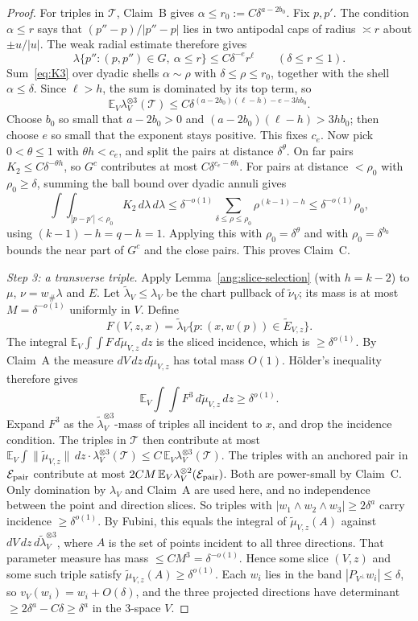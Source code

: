 \documentclass[11pt,reqno]{amsart}
\begin{document}
\begin{proof}
For triples in $\mathcal T$, Claim~B gives $\alpha\le r_0:=C\delta^{a-2b_0}$. Fix $p,p'$. The condition $\alpha\le r$ says that $(p''-p)/|p''-p|$ lies in two antipodal caps of radius $\asymp r$ about $\pm u/|u|$. The weak radial estimate therefore gives
\[
 \lambda\{p'':(p,p'')\in G,\ \alpha\le r\}\le C\delta^{-e}r^\ell\qquad(\delta\le r\le1).
\]
Sum~\eqref{eq:K3} over dyadic shells $\alpha\sim\rho$ with $\delta\le\rho\le r_0$, together with the shell $\alpha\le\delta$. Since $\ell>h$, the sum is dominated by its top term, so
\[
 \mathbb E_V\lambda_V^{\otimes3}(\mathcal T)\le C\delta^{(a-2b_0)(\ell-h)-e-3hb_0}.
\]
Choose $b_0$ so small that $a-2b_0>0$ and $(a-2b_0)(\ell-h)>3hb_0$; then choose $e$ so small that the exponent stays positive. This fixes $c_e$. Now pick $0<\theta\le1$ with $\theta h<c_e$, and split the pairs at distance $\delta^\theta$. On far pairs $K_2\le C\delta^{-\theta h}$, so $G^c$ contributes at most $C\delta^{c_e-\theta h}$. For pairs at distance $<\rho_0$ with $\rho_0\ge\delta$, summing the ball bound over dyadic annuli gives
\[
 \int\!\!\int_{|p-p'|<\rho_0}K_2\,d\lambda\,d\lambda\le\delta^{-o(1)}\sum_{\delta\le\rho\le\rho_0}\rho^{(k-1)-h}\le\delta^{-o(1)}\rho_0,
\]
using $(k-1)-h=q-h=1$. Applying this with $\rho_0=\delta^\theta$ and with $\rho_0=\delta^{b_0}$ bounds the near part of $G^c$ and the close pairs. This proves Claim~C.

\emph{Step 3: a transverse triple.} Apply Lemma~\ref{ang:slice-selection} (with $h=k-2$) to $\mu$, $\nu=w_\#\lambda$ and $E$. Let $\widetilde\lambda_V\le\lambda_V$ be the chart pullback of $\widetilde\nu_V$; its mass is at most $M=\delta^{-o(1)}$ uniformly in $V$. Define
\[
 F(V,z,x)=\widetilde\lambda_V\{p:(x,w(p))\in\widetilde E_{V,z}\}.
\]
The integral $\mathbb E_V\!\int\!\!\int F\,d\widetilde\mu_{V,z}\,dz$ is the sliced incidence, which is $\ge\delta^{o(1)}$. By Claim~A the measure $dV\,dz\,d\widetilde\mu_{V,z}$ has total mass $O(1)$. Hölder's inequality therefore gives
\[
 \mathbb E_V\int\!\!\int F^3\,d\widetilde\mu_{V,z}\,dz\ge\delta^{o(1)}.
\]
Expand $F^3$ as the $\widetilde\lambda_V^{\otimes3}$-mass of triples all incident to $x$, and drop the incidence condition. The triples in $\mathcal T$ then contribute at most $\mathbb E_V\int\|\widetilde\mu_{V,z}\|\,dz\cdot\lambda_V^{\otimes3}(\mathcal T)\le C\,\mathbb E_V\lambda_V^{\otimes3}(\mathcal T)$. The triples with an anchored pair in $\mathcal E_{\rm pair}$ contribute at most $2CM\,\mathbb E_V\lambda_V^{\otimes2}(\mathcal E_{\rm pair})$. Both are power-small by Claim~C. Only domination by $\lambda_V$ and Claim~A are used here, and no independence between the point and direction slices. So triples with $|w_1\wedge w_2\wedge w_3|\ge2\delta^a$ carry incidence $\ge\delta^{o(1)}$. By Fubini, this equals the integral of $\widetilde\mu_{V,z}(A)$ against $dV\,dz\,d\widetilde\lambda_V^{\otimes3}$, where $A$ is the set of points incident to all three directions. That parameter measure has mass $\le CM^3=\delta^{-o(1)}$. Hence some slice $(V,z)$ and some such triple satisfy $\widetilde\mu_{V,z}(A)\ge\delta^{o(1)}$. Each $w_i$ lies in the band $|P_{V^\perp}w_i|\le\delta$, so $v_V(w_i)=w_i+O(\delta)$, and the three projected directions have determinant $\ge2\delta^a-C\delta\ge\delta^a$ in the $3$-space $V$.


\end{proof}
\end{document}
